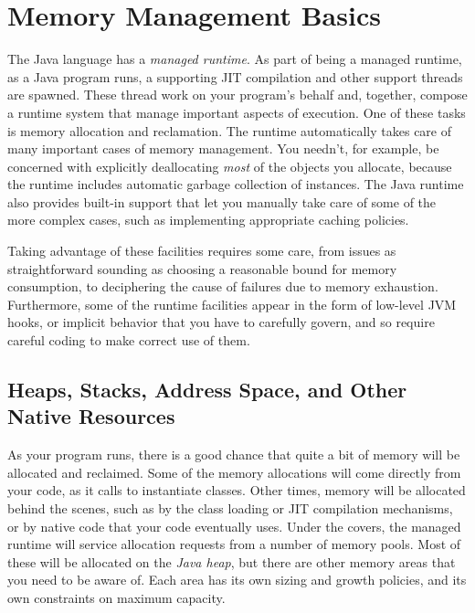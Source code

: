 
\chapter{Memory Management Basics}

The Java language has a \emph{managed runtime}. As part
of being a managed runtime, as a Java program runs, a supporting JIT compilation
and other support threads are spawned. These thread work on your program's
behalf and, together, compose a runtime system that manage important aspects of
execution. One of these tasks is memory allocation and reclamation. The runtime
automatically takes care of many important cases of memory management. You
needn't, for example, be concerned with explicitly deallocating \emph{most} of
the objects you allocate, because the runtime includes automatic garbage
collection of instances. The Java runtime also provides built-in support that
let you manually take care of some of the more complex cases, such as
implementing appropriate caching policies.

Taking advantage of these facilities requires some care, from issues as
straightforward sounding as choosing a reasonable bound for memory consumption,
to deciphering the cause of failures due to memory exhaustion. Furthermore, some
of the runtime facilities appear in the form of low-level JVM hooks, or implicit
behavior that you have to carefully govern, and so require careful coding to
make correct use of them.

\section{Heaps, Stacks, Address Space, and Other Native Resources}

As your program runs, there is a good chance that quite a bit of memory will be
allocated and reclaimed. Some of the memory allocations will come directly from
your code, as it calls  to instantiate classes. Other times, memory
will be allocated behind the scenes, such as by the class loading or JIT
compilation mechanisms, or by native code that your code eventually uses. Under
the covers, the managed runtime will service allocation requests from a number
of memory pools. Most of these will be allocated on the \emph{Java heap}, but
there are other memory areas that you need to be aware of. Each area has its own
sizing and growth policies, and its own constraints on maximum capacity.

